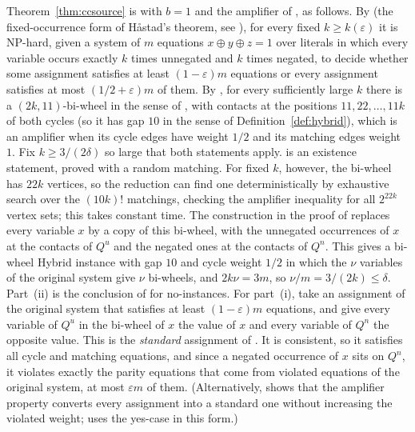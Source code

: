 \documentclass[11pt]{amsart}
\theoremstyle{definition}
\theoremstyle{remark}
\numberwithin{equation}{section}
\newcommand{\eps}{\varepsilon}
\begin{document}
Theorem~\ref{thm:ccsource} is \cite[Theorem~3]{CC22} with $b=1$ and the amplifier of \cite[Theorem~5]{CC22}, as follows. By \cite[Theorem~2]{CC22} (the fixed-occurrence form of H\aa{}stad's theorem, see \cite{CC03}), for every fixed $k\ge k(\eps)$ it is NP-hard, given a system of $m$ equations $x\oplus y\oplus z=1$ over literals in which every variable occurs exactly $k$ times unnegated and $k$ times negated, to decide whether some assignment satisfies at least $(1-\eps)m$ equations or every assignment satisfies at most $(1/2+\eps)m$ of them. By \cite[Theorem~5]{CC22}, for every sufficiently large $k$ there is a $(2k,11)$-bi-wheel in the sense of \cite[Definition~2]{CC22}, with contacts at the positions $11,22,\dots,11k$ of both cycles (so it has gap $10$ in the sense of Definition~\ref{def:hybrid}), which is an amplifier \cite[Definition~1]{CC22} when its cycle edges have weight $1/2$ and its matching edges weight $1$. Fix $k\ge3/(2\delta)$ so large that both statements apply. \cite[Theorem~5]{CC22} is an existence statement, proved with a random matching. For fixed $k$, however, the bi-wheel has $22k$ vertices, so the reduction can find one deterministically by exhaustive search over the $(10k)!$ matchings, checking the amplifier inequality for all $2^{22k}$ vertex sets; this takes constant time. The construction in the proof of \cite[Theorem~3]{CC22} replaces every variable $x$ by a copy of this bi-wheel, with the unnegated occurrences of $x$ at the contacts of $Q^u$ and the negated ones at the contacts of $Q^n$. This gives a bi-wheel Hybrid instance with gap $10$ and cycle weight $1/2$ in which the $\nu$ variables of the original system give $\nu$ bi-wheels, and $2k\nu=3m$, so $\nu/m=3/(2k)\le\delta$. Part~(ii) is the conclusion of \cite[Theorem~3]{CC22} for no-instances. For part~(i), take an assignment of the original system that satisfies at least $(1-\eps)m$ equations, and give every variable of $Q^u$ in the bi-wheel of $x$ the value of $x$ and every variable of $Q^n$ the opposite value. This is the \emph{standard} assignment of \cite[\S2]{CC22}. It is consistent, so it satisfies all cycle and matching equations, and since a negated occurrence of $x$ sits on $Q^n$, it violates exactly the parity equations that come from violated equations of the original system, at most $\eps m$ of them. (Alternatively, \cite[\S2]{CC22} shows that the amplifier property converts every assignment into a standard one without increasing the violated weight; \cite[Lemma~1]{CC22} uses the yes-case in this form.)

\end{document}
